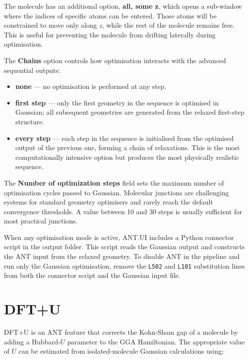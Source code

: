 \documentclass[12pt]{article}
\begin{document}
The molecule has an additional option, \textbf{all, some z}, which opens a sub-window where the indices of specific atoms can be entered. Those atoms will be constrained to move only along $z$, while the rest of the molecule remains free. This is useful for preventing the molecule from drifting laterally during optimisation.

The \textbf{Chains} option controls how optimisation interacts with the advanced sequential outputs:

\begin{itemize}
    \item \textbf{none} — no optimisation is performed at any step.
    \item \textbf{first step} — only the first geometry in the sequence is optimised in Gaussian; all subsequent geometries are generated from the relaxed first-step structure.
    \item \textbf{every step} — each step in the sequence is initialised from the optimised output of the previous one, forming a chain of relaxations. This is the most computationally intensive option but produces the most physically realistic sequence.
\end{itemize}

The \textbf{Number of optimization steps} field sets the maximum number of optimisation cycles passed to Gaussian. Molecular junctions are challenging systems for standard geometry optimisers and rarely reach the default convergence thresholds. A value between 10 and 30 steps is usually sufficient for most practical junctions.

When any optimisation mode is active, ANT.UI includes a Python connector script in the output folder. This script reads the Gaussian output and constructs the ANT input from the relaxed geometry. To disable ANT in the pipeline and run only the Gaussian optimisation, remove the \texttt{L502} and \texttt{L101} substitution lines from both the connector script and the Gaussian input file.

\newpage

\section{DFT+U}\label{sec:dftu}

DFT+U is an ANT feature that corrects the Kohn-Sham gap of a molecule by adding a Hubbard-$U$ parameter to the GGA Hamiltonian. The appropriate value of $U$ can be estimated from isolated-molecule Gaussian calculations using:
\end{document}
